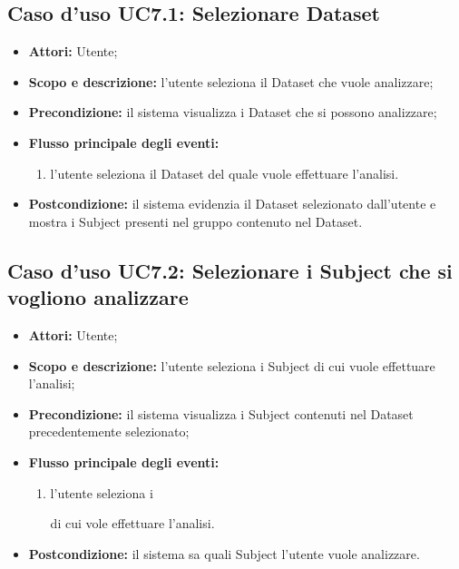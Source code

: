 \subsection{Caso d'uso UC7.1: Selezionare Dataset}
\begin{itemize}
\item \textbf{Attori:} Utente;
\item \textbf{Scopo e descrizione:} l'utente seleziona il Dataset\glossario{} che vuole analizzare;
\item \textbf{Precondizione:} il sistema visualizza i Dataset\glossario{} che si possono analizzare;
\item \textbf{Flusso principale degli eventi:}
\begin{enumerate}
\item l'utente seleziona il Dataset\glossario{} del quale vuole effettuare l'analisi. 
\end{enumerate}
\item \textbf{Postcondizione:} il sistema evidenzia il Dataset\glossario{} selezionato dall'utente e mostra i Subject\glossario{} presenti nel gruppo contenuto nel Dataset\glossario{}.
\end{itemize}

\subsection{Caso d'uso UC7.2: Selezionare i Subject che si vogliono analizzare}
\begin{itemize}
\item \textbf{Attori:} Utente;
\item \textbf{Scopo e descrizione:} l'utente seleziona i Subject\glossario{} di cui vuole effettuare l'analisi;
\item \textbf{Precondizione:} il sistema visualizza i Subject\glossario{} contenuti nel Dataset\glossario{} precedentemente selezionato;
\item \textbf{Flusso principale degli eventi:}
\begin{enumerate}
\item l'utente seleziona i \subject{} di cui vole effettuare l'analisi.
\end{enumerate}
\item \textbf{Postcondizione:} il sistema sa quali Subject\glossario{} l'utente vuole analizzare.
\end{itemize}


